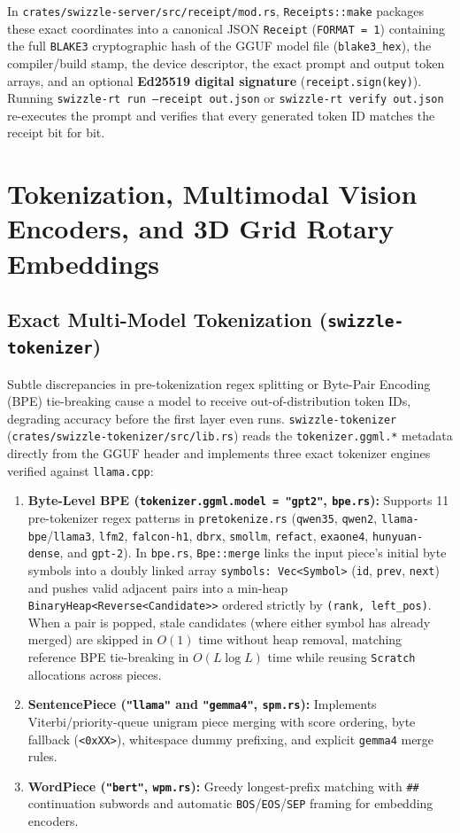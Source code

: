 \documentclass[10pt,a4paper]{article}
\theoremstyle{swzstyle}
\newcommand{\code}[1]{\texttt{#1}}
\begin{document}
In \code{crates/swizzle-server/src/receipt/mod.rs}, \code{Receipts::make} packages these exact coordinates into a canonical JSON \code{Receipt} (\code{FORMAT = 1}) containing the full \code{BLAKE3} cryptographic hash of the GGUF model file (\code{blake3\_hex}), the compiler/build stamp, the device descriptor, the exact prompt and output token arrays, and an optional \textbf{Ed25519 digital signature} (\code{receipt.sign(key)}). Running \code{swizzle-rt run --receipt out.json} or \code{swizzle-rt verify out.json} re-executes the prompt and verifies that every generated token ID matches the receipt bit for bit.

\section{Tokenization, Multimodal Vision Encoders, and 3D Grid Rotary Embeddings}

\subsection{Exact Multi-Model Tokenization (\texttt{swizzle-tokenizer})}

Subtle discrepancies in pre-tokenization regex splitting or Byte-Pair Encoding (BPE) tie-breaking cause a model to receive out-of-distribution token IDs, degrading accuracy before the first layer even runs. \code{swizzle-tokenizer} (\code{crates/swizzle-tokenizer/src/lib.rs}) reads the \code{tokenizer.ggml.*} metadata directly from the GGUF header and implements three exact tokenizer engines verified against \code{llama.cpp}:
\begin{enumerate}
  \item \textbf{Byte-Level BPE (\code{tokenizer.ggml.model = "gpt2"}, \code{bpe.rs}):} Supports 11 pre-tokenizer regex patterns in \code{pretokenize.rs} (\code{qwen35}, \code{qwen2}, \code{llama-bpe}/\code{llama3}, \code{lfm2}, \code{falcon-h1}, \code{dbrx}, \code{smollm}, \code{refact}, \code{exaone4}, \code{hunyuan-dense}, and \code{gpt-2}). In \code{bpe.rs}, \code{Bpe::merge} links the input piece's initial byte symbols into a doubly linked array \code{symbols: Vec<Symbol>} (\code{id}, \code{prev}, \code{next}) and pushes valid adjacent pairs into a min-heap \code{BinaryHeap<Reverse<Candidate>>} ordered strictly by \code{(rank, left\_pos)}. When a pair is popped, stale candidates (where either symbol has already merged) are skipped in $O(1)$ time without heap removal, matching reference BPE tie-breaking in $O(L \log L)$ time while reusing \code{Scratch} allocations across pieces.
  \item \textbf{SentencePiece (\code{"llama"} and \code{"gemma4"}, \code{spm.rs}):} Implements Viterbi/priority-queue unigram piece merging with score ordering, byte fallback (\code{<0xXX>}), whitespace dummy prefixing, and explicit \code{gemma4} merge rules.
  \item \textbf{WordPiece (\code{"bert"}, \code{wpm.rs}):} Greedy longest-prefix matching with \code{\#\#} continuation subwords and automatic \code{BOS}/\code{EOS}/\code{SEP} framing for embedding encoders.
\end{enumerate}
\end{document}
